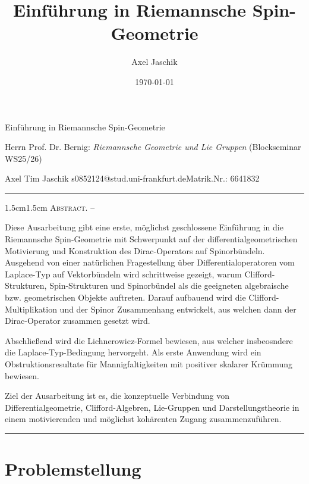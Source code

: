 \documentclass[10pt, letterpaper]{article}
\title{Einführung in Riemannsche Spin-Geometrie}
\author{Axel Jaschik}
\date{\today}
\renewenvironment{abstract}
  {
    \begin{adjustwidth}{1.5cm}{1.5cm}
    \small
    \textsc{Abstract. –}%
  }
  {
    \end{adjustwidth}
  }
\begin{document}
\begin{center}
    \Large{Einführung in Riemannsche Spin-Geometrie}\\[10pt]
\end{center}
\vspace{0.1cm}

\begin{center}
     {Herrn Prof. Dr. Bernig: \textit{Riemannsche Geometrie und Lie Gruppen} (Blockseminar WS25/26)}\\
\end{center}


\begin{center}
    \footnotesize{Axel Tim Jaschik \qquad s0852124@stud.uni-frankfurt.de\qquad Matrik.Nr.: 6641832}
\end{center}

\rule{\textwidth}{0.5pt}
\begin{abstract}
Diese Ausarbeitung gibt eine erste, möglichst geschlossene Einführung in die Riemannsche Spin-Geometrie mit Schwerpunkt auf der differentialgeometrischen Motivierung und Konstruktion des Dirac-Operators auf Spinorbündeln. Ausgehend von einer natürlichen Fragestellung über Differentialoperatoren vom Laplace-Typ auf Vektorbündeln wird schrittweise gezeigt, warum Clifford-Strukturen, Spin-Strukturen und Spinorbündel als die geeigneten algebraische bzw. geometrischen Objekte auftreten. Darauf aufbauend wird die Clifford-Multiplikation und der Spinor Zusammenhang entwickelt, aus welchen dann der Dirac-Operator zusammen gesetzt wird. 

Abschließend wird die Lichnerowicz-Formel bewiesen, aus welcher insbeosndere die Laplace-Typ-Bedingung hervorgeht. Als erste Anwendung wird ein Obstruktionsresultate für Mannigfaltigkeiten mit positiver skalarer Krümmung bewiesen.

Ziel der Ausarbeitung ist es, die konzeptuelle Verbindung von Differentialgeometrie, Clifford-Algebren, Lie-Gruppen und Darstellungstheorie in einem motivierenden und möglichst kohärenten Zugang zusammenzuführen.

\end{abstract}
\rule{\textwidth}{0.5pt}
\vspace{0.1cm}


\tableofcontents


\vspace{0.8cm}


\section{Problemstellung}
\end{document}
